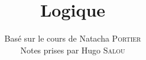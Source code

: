 \documentclass{../notes}
\title{Logique}
\author{Basé sur le cours de Natacha \textsc{Portier}\\ Notes prises par Hugo \textsc{Salou}}
\begin{document}
  \maketitle

  \dominitoc
  \tableofcontents

  \pagebreak

  
  
  
  
\end{document}
